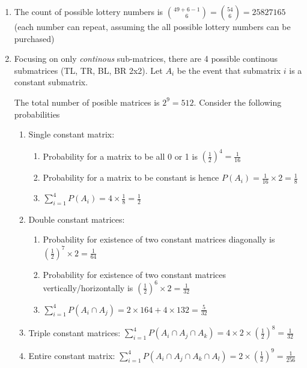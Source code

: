 \documentclass{article}
\begin{document}
\begin{enumerate}[label=(\alph*)]
    \item The count of possible lottery numbers is $\binom{49+6-1}{6} = \binom{54}{6} = 25827165$ (each number can repeat, assuming the all possible lottery numbers can be purchased)
    \item Focusing on only \textit{continous} sub-matrices, there are 4 possible continous submatrices (TL, TR, BL, BR 2x2). Let $A_i$ be the event that submatrix $i$ is a constant submatrix.

          The total number of posible matrices is $2^9 = 512$. Consider the following probabilities

          \begin{enumerate}
              \item Single constant matrix:
                    \begin{enumerate}
                        \item Probability for a matrix to be all 0 or 1 is $(\frac12)^4 = \frac{1}{16}$
                        \item Probability for a matrix to be constant is hence $P(A_i) = \frac{1}{16} \times 2 = \frac{1}{8}$
                        \item $\sum_{i=1}^{4} P(A_i) = 4\times\frac{1}{8} = \frac{1}{2}$
                    \end{enumerate}
              \item Double constant matrices:
                    \begin{enumerate}
                        \item Probability for existence of two constant matrices diagonally is $(\frac12)^7 \times 2 = \frac{1}{64}$
                        \item Probability for existence of two constant matrices vertically/horizontally is $(\frac12)^6 \times 2 = \frac{1}{32}$
                        \item $\sum_{i=1}^{4} P(A_i \cap A_j) = 2 \times{1}{64} + 4 \times {1}{32} = \frac{5}{32}$
                    \end{enumerate}
              \item Triple constant matrices: $\sum_{i=1}^{4} P(A_i \cap A_j \cap A_k) = 4 \times 2 \times (\frac12)^8 = \frac{1}{32}$
              \item Entire constant matrix: $\sum_{i=1}^{4} P(A_i \cap A_j \cap A_k \cap A_l) = 2 \times (\frac12)^9 = \frac{1}{256}$
          \end{enumerate}


\end{enumerate}
\end{document}
